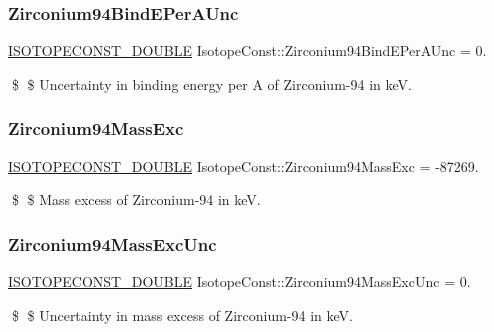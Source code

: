 \subsubsection{\texorpdfstring{Zirconium94\+Bind\+E\+Per\+A\+Unc}{Zirconium94BindEPerAUnc}}
{\footnotesize\ttfamily \mbox{\hyperlink{group___isotope_const-_macros_ga8f45a7272ce02c0b4c65c44636ed719a}{I\+S\+O\+T\+O\+P\+E\+C\+O\+N\+S\+T\+\_\+\+D\+O\+U\+B\+LE}} Isotope\+Const\+::\+Zirconium94\+Bind\+E\+Per\+A\+Unc = 0.}

\$ \$ Uncertainty in binding energy per A of Zirconium-\/94 in keV. \mbox{\label{group___isotope_const-_zirconium-_zr94_gae858b6bda2e8a5965a29c058dda02691}} 
\subsubsection{\texorpdfstring{Zirconium94\+Mass\+Exc}{Zirconium94MassExc}}
{\footnotesize\ttfamily \mbox{\hyperlink{group___isotope_const-_macros_ga8f45a7272ce02c0b4c65c44636ed719a}{I\+S\+O\+T\+O\+P\+E\+C\+O\+N\+S\+T\+\_\+\+D\+O\+U\+B\+LE}} Isotope\+Const\+::\+Zirconium94\+Mass\+Exc = -\/87269.}

\$ \$ Mass excess of Zirconium-\/94 in keV. \mbox{\label{group___isotope_const-_zirconium-_zr94_gaa9cfec01107236454d832a8c64c1fa85}} 
\subsubsection{\texorpdfstring{Zirconium94\+Mass\+Exc\+Unc}{Zirconium94MassExcUnc}}
{\footnotesize\ttfamily \mbox{\hyperlink{group___isotope_const-_macros_ga8f45a7272ce02c0b4c65c44636ed719a}{I\+S\+O\+T\+O\+P\+E\+C\+O\+N\+S\+T\+\_\+\+D\+O\+U\+B\+LE}} Isotope\+Const\+::\+Zirconium94\+Mass\+Exc\+Unc = 0.}

\$ \$ Uncertainty in mass excess of Zirconium-\/94 in keV. \mbox{\label{group___isotope_const-_zirconium-_zr94_gabbd4e21ec1d7b64e7773b291482d0559}} 
